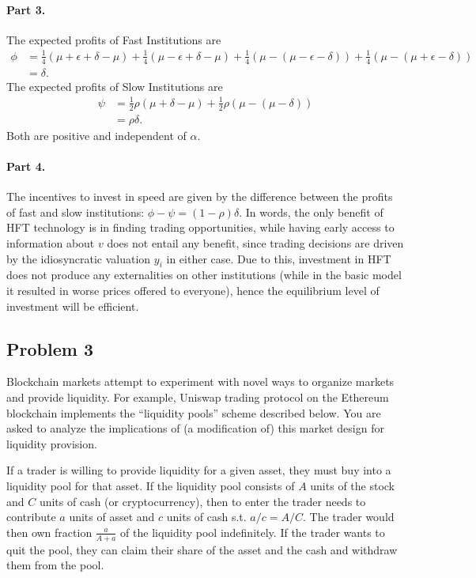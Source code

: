 \begin{solution}
	\paragraph{Part 3.}
	The expected profits of Fast Institutions are
	\begin{align*}
		\phi &= \frac{1}{4} (\mu + \epsilon + \delta - \mu) + \frac{1}{4} (\mu - \epsilon + \delta - \mu) + \frac{1}{4} (\mu - (\mu - \epsilon - \delta)) + \frac{1}{4} (\mu - (\mu + \epsilon - \delta))
		\\
		&= \delta.
	\end{align*}
	The expected profits of Slow Institutions are
	\begin{align*}
		\psi &= \frac{1}{2} \rho (\mu+\delta - \mu) + \frac{1}{2} \rho (\mu - (\mu - \delta))
		\\
		&= \rho \delta.
	\end{align*}
	Both are positive and independent of $\alpha$.
	
	
	\paragraph{Part 4.}
	The incentives to invest in speed are given by the difference between the profits of fast and slow institutions: $\phi - \psi = (1-\rho) \delta$. In words, the only benefit of HFT technology is in finding trading opportunities, while having early access to information about $v$ does not entail any benefit, since trading decisions are driven by the idiosyncratic valuation $y_i$ in either case. Due to this, investment in HFT does not produce any externalities on other institutions (while in the basic model it resulted in worse prices offered to everyone), hence the equilibrium level of investment will be efficient.
\end{solution}




\quad
\subsection*{Problem 3}
	Blockchain markets attempt to experiment with novel ways to organize markets and provide liquidity. For example, Uniswap trading protocol on the Ethereum blockchain implements the ``liquidity pools'' scheme described below. You are asked to analyze the implications of (a modification of) this market design for liquidity provision.
	
	If a trader is willing to provide liquidity for a given asset, they must buy into a liquidity pool for that asset. If the liquidity pool consists of $A$ units of the stock and $C$ units of cash (or cryptocurrency), then to enter the trader needs to contribute $a$ units of asset and $c$ units of cash s.t. $a/c = A/C$. The trader would then own fraction $\frac{a}{A+a}$ of the liquidity pool indefinitely. If the trader wants to quit the pool, they can claim their share of the asset and the cash and withdraw them from the pool.
	
